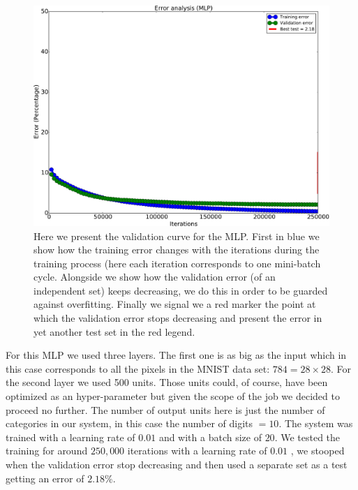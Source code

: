 \documentclass[11pt,a4paper]{article}
\begin{document}
\begin{center}
\begin{figure}[H]
\centering
\includegraphics[scale=.45]{mlp_validation.pdf} 
\caption{Here we present the validation curve for the MLP. First in blue we show how the training error changes with the iterations during the training process (here each iteration corresponds to one mini-batch cycle. Alongside we show how the validation error (of an independent set) keeps decreasing, we do this in order to be guarded against overfitting. Finally we signal we a red marker the point at which the validation error stops decreasing and present the error in yet another test set in the red legend.}
\label{fig:mlp_valiudation}
\end{figure} 
\end{center}

For this MLP we used three layers. The first one is as big as the input which in this case corresponds to all the pixels in the MNIST data set: $784 = 28 \times 28$. For the second layer we used 500 units. Those units could, of course, have been optimized as an hyper-parameter but given the scope of the job we decided to proceed no further. The number of output units here is just the number of categories in our system, in this case the number of digits $=10$. The system was trained with a learning rate of $0.01$ and with a batch size of $20$. We tested the training for around $250,000$ iterations with a learning rate of $0.01$ , we stooped when the validation error stop decreasing and then used a separate set as a test getting an error of $2.18 \%$. 
\end{document}

